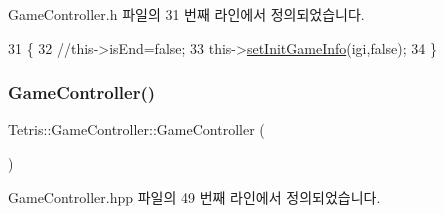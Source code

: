 Game\+Controller.\+h 파일의 31 번째 라인에서 정의되었습니다.


\begin{DoxyCode}
31                                              \{
32                 \textcolor{comment}{//this->isEnd=false;}
33                 this->\hyperlink{class_tetris_1_1_game_controller_a0d835f535b48529ca536115dd8123099}{setInitGameInfo}(igi,\textcolor{keyword}{false});
34             \}
\end{DoxyCode}
\mbox{\label{class_tetris_1_1_game_controller_a968c9a79fca8a5a39e0c51edca0e5abb}} 
\subsubsection{\texorpdfstring{Game\+Controller()}{GameController()}\hspace{0.1cm}{\footnotesize\ttfamily [3/4]}}
{\footnotesize\ttfamily Tetris\+::\+Game\+Controller\+::\+Game\+Controller (\begin{DoxyParamCaption}{ }\end{DoxyParamCaption})\hspace{0.3cm}{\ttfamily [inline]}}



Game\+Controller.\+hpp 파일의 49 번째 라인에서 정의되었습니다.


